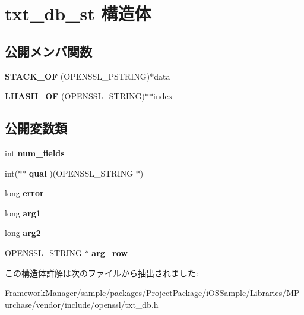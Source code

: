 \hypertarget{structtxt__db__st}{}\section{txt\+\_\+db\+\_\+st 構造体}
\label{structtxt__db__st}
\subsection*{公開メンバ関数}
\begin{DoxyCompactItemize}
\item 
\hypertarget{structtxt__db__st_a958a380d2e5b16f19c46f4b619be7bbd}{}{\bfseries S\+T\+A\+C\+K\+\_\+\+O\+F} (O\+P\+E\+N\+S\+S\+L\+\_\+\+P\+S\+T\+R\+I\+N\+G)$\ast$data\label{structtxt__db__st_a958a380d2e5b16f19c46f4b619be7bbd}

\item 
\hypertarget{structtxt__db__st_a66bdaf7f42a43b4c92d25c0e1044f17e}{}{\bfseries L\+H\+A\+S\+H\+\_\+\+O\+F} (O\+P\+E\+N\+S\+S\+L\+\_\+\+S\+T\+R\+I\+N\+G)$\ast$$\ast$index\label{structtxt__db__st_a66bdaf7f42a43b4c92d25c0e1044f17e}

\end{DoxyCompactItemize}
\subsection*{公開変数類}
\begin{DoxyCompactItemize}
\item 
\hypertarget{structtxt__db__st_ac5e40d76de4af9e3eb8126c5c71f35ee}{}int {\bfseries num\+\_\+fields}\label{structtxt__db__st_ac5e40d76de4af9e3eb8126c5c71f35ee}

\item 
\hypertarget{structtxt__db__st_af87dc62965306c802fc5d25b33eb0ffd}{}int($\ast$$\ast$ {\bfseries qual} )(O\+P\+E\+N\+S\+S\+L\+\_\+\+S\+T\+R\+I\+N\+G $\ast$)\label{structtxt__db__st_af87dc62965306c802fc5d25b33eb0ffd}

\item 
\hypertarget{structtxt__db__st_addce5883079df416612638f30157ba9d}{}long {\bfseries error}\label{structtxt__db__st_addce5883079df416612638f30157ba9d}

\item 
\hypertarget{structtxt__db__st_ae3f2f91927e152a865eecf288a8a5190}{}long {\bfseries arg1}\label{structtxt__db__st_ae3f2f91927e152a865eecf288a8a5190}

\item 
\hypertarget{structtxt__db__st_ae99864667eb99fd2d18fc91293df6249}{}long {\bfseries arg2}\label{structtxt__db__st_ae99864667eb99fd2d18fc91293df6249}

\item 
\hypertarget{structtxt__db__st_a67601c6116a02bdb8ca45dc529da3255}{}O\+P\+E\+N\+S\+S\+L\+\_\+\+S\+T\+R\+I\+N\+G $\ast$ {\bfseries arg\+\_\+row}\label{structtxt__db__st_a67601c6116a02bdb8ca45dc529da3255}

\end{DoxyCompactItemize}


この構造体詳解は次のファイルから抽出されました\+:\begin{DoxyCompactItemize}
\item 
Framework\+Manager/sample/packages/\+Project\+Package/i\+O\+S\+Sample/\+Libraries/\+M\+Purchase/vendor/include/openssl/txt\+\_\+db.\+h\end{DoxyCompactItemize}
